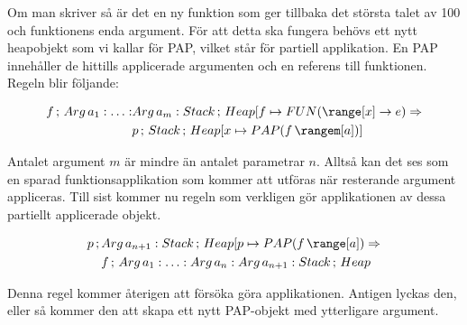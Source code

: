 \documentclass[../Core]{subfiles}
\begin{document}
Om man skriver  så är det en ny funktion som
ger tillbaka det största talet av 100 och funktionens enda argument. För att
detta ska fungera behövs ett nytt heapobjekt som vi kallar för PAP, vilket står för partiell
applikation. En PAP innehåller de hittills applicerade argumenten och en referens till funktionen.
Regeln blir följande:

\begin{align*}
f\,;\, Arg\, a_{1}:\ldots:&Arg\, a_{m}:Stack\,;\, Heap[f\mapsto\FUN{\range[x]}e \Rightarrow \\
 & p\,;\, Stack\,;\, Heap[x\mapsto\PAP f{\rangem[a]}]
\end{align*}


Antalet argument $m$ är mindre än antalet parametrar $n$.
Alltså kan det ses som en sparad funktionsapplikation som kommer att
utföras när resterande argument appliceras. Till sist kommer nu
regeln som verkligen gör applikationen av dessa partiellt applicerade
objekt.

\begin{align*}
p\,;\, & Arg\, a_{n+1}:Stack\,;\, Heap[p\mapsto\PAP f{\range[a]} \Rightarrow \\
 & f\,;\, Arg\, a_{1}:\ldots:Arg\, a_{n}:Arg\, a_{n+1}:Stack\,;\, Heap
\end{align*}


Denna regel kommer återigen att försöka göra applikationen. Antigen lyckas
den, eller så kommer den att skapa ett nytt PAP-objekt med ytterligare
argument.
\end{document}
